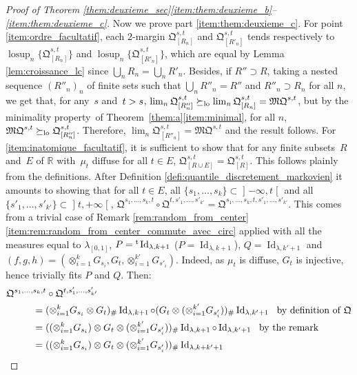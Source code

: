\documentclass[JEP,XML,SOM,Unicode,NoEqCountersInSection,NoFloatCountersInSection,published]{cedram}
\theoremstyle{plain}
\theoremstyle{definition}
\newcommand{\como}{\mathfrak{Q}}
\newcommand{\mq}{\mathfrak{MQ}}
\newcommand{\Id}{\operatorname{Id}}
\newcommand{\trans}{{}^{\mathrm{t}}\mkern-1mu}
\newcommand{\la}{\lambda}
\newcommand{\R}{\mathbb{R}}
\newcommand{\lcsup}{\operatorname{losup}}
\newcommand{\op}{\mathopen}
\newcommand{\clo}{\mathclose}
\newcommand{\geqlc}{\succeq_{\rm lo}}
\begin{document}
\begin{proof}[Proof of Theorem \ref{them:deuxieme_sec}\eqref{item:them:deuxieme_b}--\eqref{item:them:deuxieme_c}]
Now we prove part \eqref{item:them:deuxieme_c}. For point \eqref{item:ordre_facultatif}, each 2-margin $\como_{[R_n]}^{s,t}$ and $\como_{[R'_n]}^{s,t}$ tends respectively to $\lcsup_n\{\como_{[R_n]}^{s,t}\}$ and $\lcsup_n\{\como_{[R'_n]}^{s,t}\}$, which are equal by Lemma \ref{lem:croissance_lc} since $\bigcup_nR_n=\bigcup_nR'_n$. Besides, if $R''\supset R$, taking a nested sequence $(R''_n)_n$ of fini\-te sets such that $\bigcup_n R''_n=R''$ and $R''_n\supset R_n$ for all $n$, we get that, for any~$s$ and~$t>\nobreak s$, $\lim_n\como_{[R''_n]}^{s,t}\geqlc \lim_n\como_{[R_n]}^{s,t}=\mq^{s,t}$, but by the minimality property~of \hbox{Theorem}~\ref{them:a}\eqref{item:minimal}, for all $n$, $\mq^{s,t}\geqlc\como_{[R''_n]}^{s,t}$. Therefore, $\lim_n\como_{[R''_n]}^{s,t}=\mq^{s,t}$ and the result follows. For \eqref{item:inatomique_facultatif}, it is sufficient to show that for any finite subsets~$R$ and~$E$ of $\R$ with~$\mu_t$ diffuse for all $t\in E$, $\como_{[R\cup E]}^{s,t}=\como_{[R]}^{s,t}$. This follows plainly from the definitions. After Definition \ref{defi:quantile_discretement_markovien} it amounts to showing that for all $t\in E$, all $\{s_1,\ldots,s_k\}\subset\op]-\infty,t\clo[$ and all $\{s'_1,\ldots,s'_{k'}\}\subset\op]t,+\infty\clo[$, $\como^{s_1,\ldots,s_k,t}\circ\como^{t,s'_1,\ldots,s'_{k'}}=\como^{s_1,\ldots,s_{k},t,s'_1,\ldots,s'_{k'}}$. This comes from a trivial case of Remark \ref{rem:random_from_center}\eqref{item:rem:random_from_center_commute_avec_circ} applied with all the measures equal to $\la_{[0,1]}$, $P=\trans\Id_{\la,k+1}$ (\ie $P=\Id_{\la,k+1}$), $Q=\Id_{\la,k'+1}$ and $(f,g,h)=(\otimes_{i=1}^k G_{s_i},G_t,\otimes_{i=1}^{k'} G_{s'_i})$. Indeed, as $\mu_t$ is diffuse, $G_t$ is injective, hence trivially fits $P$ and $Q$. Then:\vspace*{-3pt}\enlargethispage{.6\baselineskip}%
\begin{align*}
\como^{s_1,\ldots,s_k,t}&\circ\como^{t,s'_1,\ldots,s'_{k'}}\\
&\hspace*{-5mm}=(\otimes_{i=1}^k G_{s_i}\otimes G_t)_\#\Id_{\la,k+1}\circ(G_t\otimes (\otimes_{i=1}^{k'} G_{s'_i}))_\#\Id_{\la,k'+1}\ \ \text{by definition of $\como$}\\
&\hspace*{-5mm}=((\otimes_{i=1}^k G_{s_i})\otimes G_t\otimes (\otimes_{i=1}^{k'} G_{s'_i}))_\#\Id_{\la,k+1}\circ\Id_{\la,k'+1}\ \ \text{by the remark}\\
&\hspace*{-5mm}=((\otimes_{i=1}^k G_{s_i})\otimes G_t \otimes (\otimes_{i=1}^{k'} G_{s'_i}))_\#\Id_{\la,k+k'+1}\\

\end{align*}
\end{proof}
\end{document}
